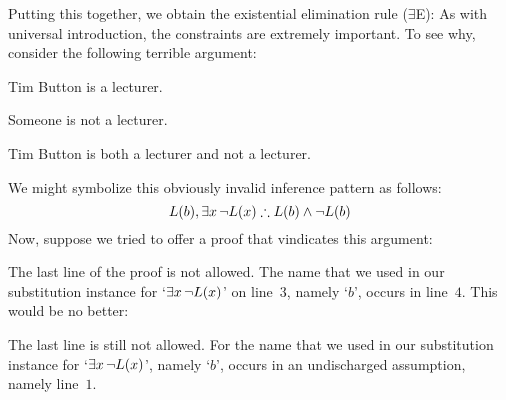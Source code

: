 Putting this together, we obtain the existential elimination rule ($\exists$E):
As with universal introduction, the constraints are extremely important. To see why, consider the following terrible argument:
	\begin{earg}
		\item Tim Button is a lecturer. 
		\item Someone is not a lecturer. 
		\item[\texttherefore] Tim Button is both a lecturer and not a lecturer.
	\end{earg}
We might symbolize this obviously invalid inference pattern as follows:
$$\atom{L}{b}, \exists x\, \enot\atom{L}{x} \therefore \atom{L}{b} \eand \enot \atom{L}{b}$$
Now, suppose we tried to offer a proof that vindicates this argument:
\begin{fitchproof}
	\PR
	\open	
		\AS
	\close
\ifHTMLtarget
\else
\fi
\end{fitchproof}
The last line of the proof is not allowed. The name that we used in our substitution instance for `$\exists x\, \neg \mathord{L}(x)$' on line~$3$, namely `$b$', occurs in line~$4$. This would be no better:
\begin{fitchproof}
	\PR
	\PR
	\open
		\AS
	\close
\ifHTMLtarget
\else
\fi
\end{fitchproof}
The last line is still not allowed. For the name that we used in our substitution instance for `$\exists x\, \neg \mathord{L}(x)$', namely `$b$', occurs in an undischarged assumption, namely line~$1$.

